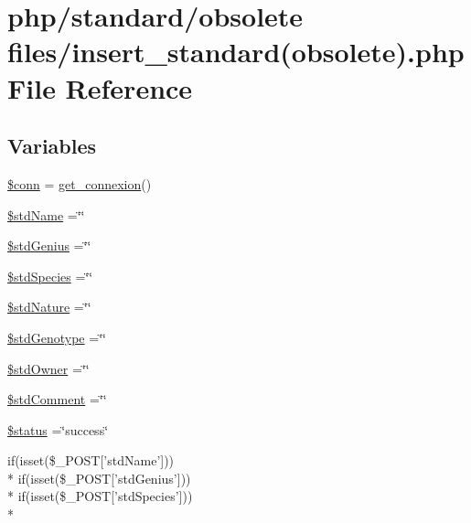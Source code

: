 \hypertarget{insert__standard_07obsolete_08_8php}{\section{php/standard/obsolete files/insert\-\_\-standard(obsolete).php File Reference}
\label{insert__standard_07obsolete_08_8php}
}
\subsection*{Variables}
\begin{DoxyCompactItemize}
\item 
\hyperlink{insert__standard_07obsolete_08_8php_aa8a5a87b9c1a6a0819b88447cbe41877}{\$conn} = \hyperlink{php__functions_8php_ace18bc10f3fd08f92688ac743e0d8c2e}{get\-\_\-connexion}()
\item 
\hyperlink{insert__standard_07obsolete_08_8php_a04bd6b914feb54eeeb053d3f690fea50}{\$std\-Name} =\char`\"{}\char`\"{}
\item 
\hyperlink{insert__standard_07obsolete_08_8php_a8964a2785066a92d7c0b11ff5a0261ea}{\$std\-Genius} =\char`\"{}\char`\"{}
\item 
\hyperlink{insert__standard_07obsolete_08_8php_a1d77174f9d4320006ec140e643f95324}{\$std\-Species} =\char`\"{}\char`\"{}
\item 
\hyperlink{insert__standard_07obsolete_08_8php_a53b4aa93fde2c9f30c1eecf48472c395}{\$std\-Nature} =\char`\"{}\char`\"{}
\item 
\hyperlink{insert__standard_07obsolete_08_8php_a26327dd0b8e0254d4910cf94160bb302}{\$std\-Genotype} =\char`\"{}\char`\"{}
\item 
\hyperlink{insert__standard_07obsolete_08_8php_ab6c56dc36eabf5961ac9ee1de239c3a4}{\$std\-Owner} =\char`\"{}\char`\"{}
\item 
\hyperlink{insert__standard_07obsolete_08_8php_a57ad1d0043a566efde8a4fb592d52b18}{\$std\-Comment} =\char`\"{}\char`\"{}
\item 
\hyperlink{insert__standard_07obsolete_08_8php_a58391ea75f2d29d5d708d7050b641c33}{\$status} =\char`\"{}success\char`\"{}
\item 
if(isset(\$\-\_\-\-P\-O\-S\-T\mbox{[}'std\-Name'\mbox{]})) \\*
if(isset(\$\-\_\-\-P\-O\-S\-T\mbox{[}'std\-Genius'\mbox{]})) \\*
if(isset(\$\-\_\-\-P\-O\-S\-T\mbox{[}'std\-Species'\mbox{]})) \\*

\end{DoxyCompactItemize}
